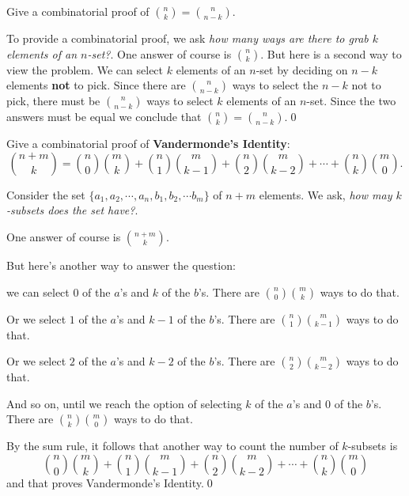\begin{exmp}
 Give a combinatorial%
  proof of   $\displaystyle {n\choose k} = {n\choose {n-k}}$.
\begin{soln}
To provide a combinatorial proof, we ask {\it how many ways are there to
grab $k$ elements of an $n$-set?}. One answer of course is $\displaystyle {n\choose k}$. But here
is a second way to view the problem. We can select $k$ elements of an $n$-set by deciding
on $n-k$ elements {\bfseries not} to pick. Since there are $\displaystyle {n\choose{n-k}}$ ways to select
the $n-k$ not to pick, there must be $\displaystyle {n\choose{n-k}}$ ways to select $k$ elements
of an $n$-set. Since the two answers must be equal we conclude that
$\displaystyle {n\choose k} = {n\choose {n-k}}$.\;\qed
\end{soln}
\end{exmp}

\begin{exmp}
Give a combinatorial proof of {\bfseries Vandermonde's Identity}: 
\[
{{n+m}\choose k} = {n\choose 0}{m\choose k}+{n\choose 1}{m\choose {k-1}}+
{n\choose 2}{m\choose {k-2}}+\cdots+{n\choose k}{m\choose 0}.
\]
\begin{soln}
 Consider the set $\{a_1,a_2,\cdots,a_n,b_1,b_2,\cdots b_m\}$ of $n+m$ elements.
 We ask, {\itshape how may $k$-subsets does the set have?}.
 
  One answer of course  is  $\displaystyle{{n+m}\choose k}$. 
  
  But here's another way to answer the question: 
 
 we can select $0$ of the $a$'s and $k$ of the $b$'s. 
 There are $ {n\choose 0}{m\choose k}$ ways  to do that. 
 
 Or we select $1$ of the $a$'s and $k-1$ of the $b$'s. 
 There are $ {n\choose 1}{m\choose k-1}$ ways to do that. 
 
 Or we select $2$ of the $a$'s and $k-2$ of the $b$'s. 
 There are $ {n\choose 2}{m\choose k-2}$ ways to do that.
 
 And so on, until we reach the option of  selecting $k$ of the $a$'s and $0$ of the $b$'s. 
 There are $ {n\choose k}{m\choose 0}$ ways to do that.
 
 By the sum rule, it follows that another way to count the number of $k$-subsets is
 $$ {n\choose 0}{m\choose k}+{n\choose 1}{m\choose {k-1}}+
 {n\choose 2}{m\choose {k-2}}+\cdots +{n\choose k}{m\choose 0}
 $$
 and that proves Vandermonde's Identity.\;\qed
\end{soln}
\end{exmp}
 
